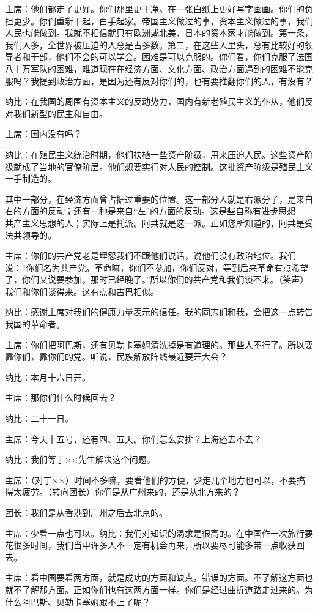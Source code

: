 主席：他们都走了更好。你们那里更干净。在一张白纸上更好写字画画。你们的负担更少。你们重新干起，白手起家。帝国主义做过的事，资本主义做过的事，我们人民也能做到。我就不相信就只有欧洲或北美、日本的资本家才能做到。第一条，我们人多，全世界被压迫的人总是占多数。第二，在这些人里头，总有比较好的领导者和干部，他们不会的可以学会。困难是可以克服的。你们看，你们克服了法国八十万军队的困难，难道现在在经济方面、文化方面、政治方面遇到的困难不能克服吗？我提到政治方面，是因为还有反对你们的，也有要推翻你们的人，有没有？

纳比：在我国的周围有资本主义的反动势力，国内有新老殖民主义的仆从，他们反对我们新型的民主和自由。

主席：国内没有吗？

纳比：在殖民主义统治时期，他们扶植一些资产阶级，用来压迫人民。这些资产阶级就成了当地的官僚阶层。他们想要实行对人民的控制。这批资产阶级是殖民主义一手制造的。

其中一部分，在经济方面曾占据过重要的位置。这一部分人就是右派分子，是来自右的方面的反动；还有一种是来自“左”的方面的反动。这是些自称有进步思想——共产主义思想的人；实际上是托派。阿共就是这一派。正如您所知道的，阿共是受法共领导的。

主席：你们的共产党老是埋怨我们不跟他们说话，说他们没有政治地位。我们说：“你们名为共产党。革命嘛，你们不参加，你们反对，等到后来革命有点希望了，你们又说要参加，那时已经晚了。”所以你们的共产党和我们谈不来。（笑声）我们和你们谈得来。这有点和古巴相似。

纳比：感谢主席对我们的健康力量表示的信任。我的同志们和我，会把这一点转告我国的革命者。

主席：你们把阿巴斯，还有贝勒卡塞姆清洗掉是有道理的。那些人不行了。所以要靠你们，靠你们的党。听说，民族解放阵线最近要开大会？

纳比：本月十六日开。

主席：那你们什么时候回去？

纳比：二十一日。

主席：今天十五号，还有四、五天。你们怎么安排？上海还去不去？

纳比：我们等丁××先生解决这个问题。

主席：（对丁××）时间不多嘛，要看他们的方便，少走几个地方也可以，不要搞得太疲劳。（转向团长）你们是从广州来的，还是从北方来的？

团长：我们是从香港到广州之后去北京的。

主席：少看一点也可以。纳比：我们对知识的渴求是很高的。在中国作一次旅行要花很多时间，我们当中许多人不一定有机会再来，所以要尽可能多带一点收获回去。

主席：看中国要看两方面，就是成功的方面和缺点，错误的方面。不了解这方面也就不了解那方面。正如你们也有这两方面一样。你们是经过曲折道路走过来的。为什么阿巴斯、贝勒卡塞姆跟不上了呢？

